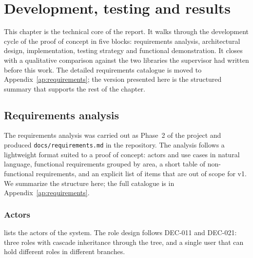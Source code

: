 
\chapter{Development, testing and results}
\label{ch:desarrollo}

This chapter is the technical core of the report. It walks through
the development cycle of the proof of concept in five blocks:
requirements analysis, architectural design, implementation, testing
strategy and functional demonstration. It closes with a qualitative
comparison against the two libraries the supervisor had written
before this work. The detailed requirements catalogue is moved to
Appendix~\ref{ap:requirements}; the version presented here is the
structured summary that supports the rest of the chapter.

\section{Requirements analysis}
\label{sec:analisis}

The requirements analysis was carried out as Phase~2 of the project
and produced \texttt{docs/requirements.md} in the repository. The
analysis follows a lightweight format suited to a proof of
concept: actors and use cases in natural language, functional
requirements grouped by area, a short table of non-functional
requirements, and an explicit list of items that are out of scope
for v1. We summarize the structure here; the full catalogue is in
Appendix~\ref{ap:requirements}.

\subsection{Actors}

 lists the actors of the system. The role design
follows DEC-011 and DEC-021: three roles with cascade inheritance
through the tree, and a single user that can hold different roles in
different branches.

